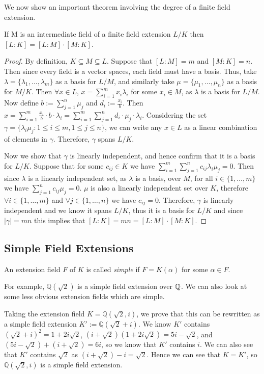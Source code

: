 We now show an important theorem involving the degree of a finite field extension. 

\begin{theorem} \label{thm:tower-theorem}
    If M is an intermediate field of a finite field extension $L/K$ then
$
    [L:K] = [L:M]\cdot[M:K]
$. 
\end{theorem}
\begin{proof}
By definition, $K \subseteq M \subseteq L$. Suppose that $[L:M]=m$ and $[M:K]=n$. Then since every field is a vector spaces, each field must have a basis. Thus, take $\lambda = \{\lambda_1,\dots,\lambda_m\}$ as a basis for $L/M$, and similarly take $\mu = \{\mu_1,\dots,\mu_n\}$ as a basis for $M/K$. Then $\forall x \in L$, $x = \sum^m_{i=1}x_i\lambda_i$ for some $x_i \in M$, as $\lambda$ is a basis for $L/M$. Now define $b:=\sum^n_{j=1}\mu_j$ and $d_i:=\frac{x_i}{b}$. Then $x=\sum^m_{i=1}\frac{x_i}{b}\cdot b \cdot \lambda_i = \sum^m_{i=1}\sum^n_{j=1}d_i\cdot \mu_j \cdot \lambda_i$. Considering the set $\gamma=\{\lambda_i\mu_j : 1\leq i \leq m, 1\leq j \leq n\}$, we can write any $x \in L$ as a linear combination of elements in $\gamma$. Therefore, $\gamma$ spans $L/K$.

Now we show that $\gamma$ is linearly independent, and hence confirm that it is a basis for $L/K$. Suppose that for some $c_{ij} \in K$ we have $\sum^m_{i=1} \sum^n_{j=1} c_{ij}\lambda_i\mu_j = 0 $. Then since $\lambda$ is a linearly independent set, as $\lambda$ is a basis, over $M$, for all $i \in \{1,\dots,m\}$ we have $\sum^n_{j=1} c_{ij}\mu_j = 0 $. $\mu$ is also a linearly independent set over $K$, therefore $\forall i \in \{1,\dots,m\}$ and $\forall j \in \{1,\dots,n\}$ we have $c_{ij} = 0$. Therefore, $\gamma$ is linearly independent and we  know it spans $L/K$, thus it is a basis for $L/K$ and since $|\gamma|=mn$ this implies that $[L:K] = mn = [L:M]\cdot[M:K]$.
\end{proof}

\subsection{Simple Field Extensions}
\begin{definition}
An extension field \(F\) of \(K\) is called \textit{simple} if \(F = K(\alpha)\) for some \(\alpha \in F\).
\end{definition}

For example, \(\mathbb{Q}(\sqrt{2})\) is a simple field extension over \(\mathbb Q\). We can also look at some less obvious extension fields which are simple.
\begin{example}
Taking the extension field \(K = \mathbb{Q}(\sqrt{2}, i)\), we prove that this can be rewritten as a simple field extension \(K' := \mathbb{Q}(\sqrt{2} + i)\). We know \(K'\) contains
$(\sqrt{2} + i)^2 = 1 + 2i\sqrt{2}$, $(i + \sqrt{2})(1+2i\sqrt{2}) = 5i - \sqrt{2}$, and 
$(5i - \sqrt{2}) + (i + \sqrt{2}) = 6i$, 
so we know that \(K'\) contains \(i\). We can also see that \(K'\) contains \(\sqrt{2}\) as \((i+\sqrt{2})-i = \sqrt{2}\). Hence we can see that \(K = K'\), so \(\mathbb{Q}(\sqrt{2},i)\) is a simple field extension.
\end{example}

